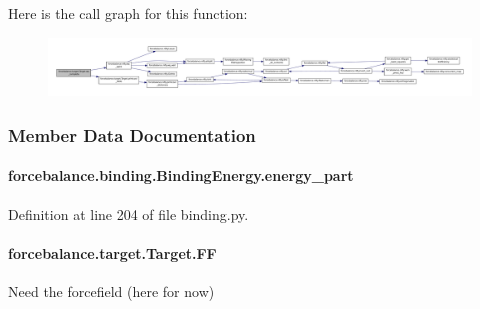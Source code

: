 Here is the call graph for this function\-:\nopagebreak
\begin{figure}[H]
\begin{center}
\leavevmode
\includegraphics[width=350pt]{classforcebalance_1_1target_1_1Target_af6099ec09486213869dba2491bd8ea04_cgraph}
\end{center}
\end{figure}




\subsubsection{Member Data Documentation}
\hypertarget{classforcebalance_1_1binding_1_1BindingEnergy_a4efa69b8f81d993b58851650d9b5ef89}{
\paragraph[{energy\-\_\-part}]{\setlength{\rightskip}{0pt plus 5cm}forcebalance.\-binding.\-Binding\-Energy.\-energy\-\_\-part}}\label{classforcebalance_1_1binding_1_1BindingEnergy_a4efa69b8f81d993b58851650d9b5ef89}


Definition at line 204 of file binding.\-py.

\hypertarget{classforcebalance_1_1target_1_1Target_a38a37919783141ea37fdcf8b00ce0aaf}{
\paragraph[{F\-F}]{\setlength{\rightskip}{0pt plus 5cm}forcebalance.\-target.\-Target.\-F\-F\hspace{0.3cm}{\ttfamily [inherited]}}}\label{classforcebalance_1_1target_1_1Target_a38a37919783141ea37fdcf8b00ce0aaf}


Need the forcefield (here for now) 




